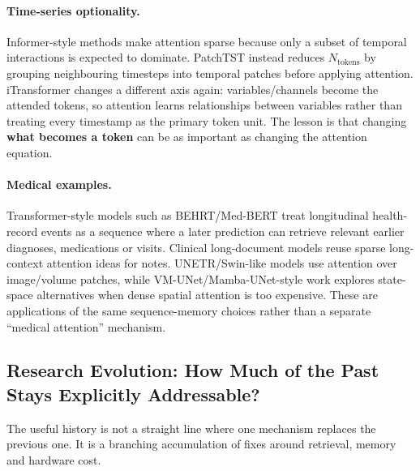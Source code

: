 \paragraph{Time-series optionality.}
Informer-style methods make attention sparse because only a subset of temporal interactions is expected to dominate.
PatchTST instead reduces $N_{\text{tokens}}$ by grouping neighbouring timesteps into temporal patches before applying attention.
iTransformer changes a different axis again: variables/channels become the attended tokens, so attention learns relationships between variables rather than treating every timestamp as the primary token unit.
The lesson is that changing \textbf{what becomes a token} can be as important as changing the attention equation.

\paragraph{Medical examples.}
Transformer-style models such as BEHRT/Med-BERT treat longitudinal health-record events as a sequence where a later prediction can retrieve relevant earlier diagnoses, medications or visits.
Clinical long-document models reuse sparse long-context attention ideas for notes.
UNETR/Swin-like models use attention over image/volume patches, while VM-UNet/Mamba-UNet-style work explores state-space alternatives when dense spatial attention is too expensive.
These are applications of the same sequence-memory choices rather than a separate ``medical attention'' mechanism.

\subsection{Research Evolution: How Much of the Past Stays Explicitly Addressable?}
The useful history is not a straight line where one mechanism replaces the previous one.
It is a branching accumulation of fixes around retrieval, memory and hardware cost.

